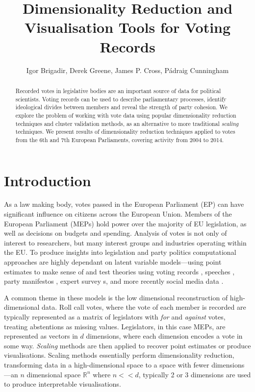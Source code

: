 \documentclass{llncs}
\title{Dimensionality Reduction and Visualisation Tools for Voting Records}
\author{Igor Brigadir\inst{1}, Derek Greene\inst{1}, James P. Cross\inst{2}, P\'{a}draig Cunningham\inst{1}}
\institute{Insight Centre for Data Analytics, University College Dublin, Ireland \\
\email{\{igor.brigadir,derek.greene,padraig.cunningham\}@insight-centre.org} 
\and
School of Politics \& International Relations, University College Dublin, Ireland \\
\email{james.cross@ucd.ie} 
}
\begin{document}
\maketitle

\begin{abstract}
Recorded votes in legislative bodies are an important source of data for political scientists. Voting records can be used to describe parliamentary processes, identify ideological divides between members and reveal the strength of party cohesion. We explore the problem of working with vote data using popular dimensionality reduction techniques and cluster validation methods, as an alternative to more traditional \emph{scaling} techniques. We present results of dimensionality reduction techniques applied to votes from the 6th and 7th European Parliaments, covering activity from 2004 to 2014.
\end{abstract}

\section{Introduction}
As a law making body, votes passed in the European Parliament (EP) can have significant influence on citizens across the European Union. Members of the European Parliament (MEPs) hold power over the majority of EU legislation, as well as decisions on budgets and spending. Analysis of votes is not only of interest to researchers, but many interest groups and industries operating within the EU. To produce insights into legislation and party politics computational approaches are highly dependant on latent variable models---using point estimates to make sense of and test theories using voting records \cite{hix2006dim}, speeches \cite{proksch2010position}, party manifestos \cite{manifesto}, expert survey s\cite{mcelroy2012policy}, and more recently social media data \cite{Barbera2014}.

A common theme in these models is the low dimensional reconstruction of high-dimensional data. Roll call votes, where the vote of each member is recorded are typically represented as a matrix of legislators with \emph{for} and \emph{against} votes, treating abstentions as missing values. Legislators, in this case MEPs, are represented as vectors in $d$ dimensions, where each dimension encodes a vote in some way. \emph{Scaling} methods are then applied to recover point estimates or produce visualisations. Scaling methods essentially perform dimensionality reduction, transforming data in a high-dimensional space to a space with fewer dimensions---an $n$ dimensional space $\mathbb{R}^n$ where $n << d$, typically 2 or 3 dimensions are used to produce interpretable visualisations.
\end{document}
